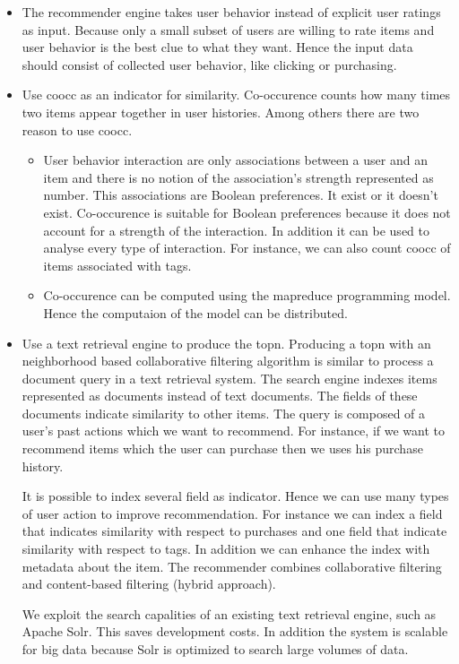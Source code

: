 \begin{itemize}
\item The recommender engine takes user behavior instead of explicit user ratings as input. Because only a small subset of users are willing to rate items and user behavior is the best clue to what they want. Hence the input data should consist of collected user behavior, like clicking or purchasing.

\item Use \gls{coocc} as an \gls{indicator} for similarity. Co-occurence counts how many times two items appear together in user histories. Among others there are two reason to use \gls{coocc}. 

\begin{itemize}
  \item User behavior interaction are only associations between a user and an item and there is no notion of the association's strength represented as number. This associations are Boolean preferences. It exist or it doesn't exist. Co-occurence is suitable for Boolean preferences because it does not account for a strength of the interaction. In addition it can be used to analyse every type of interaction. For instance, we can also count \gls{coocc} of items associated with tags.
  \item Co-occurence can be computed using the \gls{mapreduce} programming model. Hence the computaion of the model can be distributed.
\end{itemize}

\item Use a text retrieval engine to produce the \gls{topn}. Producing a \gls{topn} with an neighborhood based collaborative filtering algorithm is similar to process a document query in a text retrieval system. The search engine indexes items represented as documents instead of text documents. The fields of these documents indicate similarity to other items. The query is composed of a user's past actions which we want to recommend. For instance, if we want to recommend items which the user can purchase then we uses his purchase history. 

It is possible to index several field as indicator. Hence we can use many types of user action to improve recommendation. For instance we can index a field that indicates similarity with respect to purchases and one field that indicate similarity with respect to \glspl{tag}. In addition we can enhance the index with metadata about the item. The recommender combines collaborative filtering and content-based filtering (hybrid approach).

We exploit the search capalities of an existing text retrieval engine, such as Apache Solr. This saves development costs. In addition the system is \gls{scalable} for big data because Solr is optimized to search large volumes of data.

\end{itemize}

